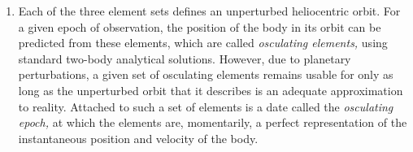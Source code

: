 \documentclass[11pt,fleqn,twoside]{article}
\renewcommand{\_}{{\tt\char'137}}     %
\begin{document}
{\begin{enumerate}
        ${\tt jform}=3$, suitable for comets:
 
        \begin{tabbing}
        xxx \= xxxxxxx \= xx \= \kill
        \> {\tt epoch}  \> = \> epoch of perihelion $T$ (TDB MJD) \\
        \> {\tt orbinc} \> = \> inclination $i$ (radians) \\
        \> {\tt anode}  \> = \> longitude of the ascending node $\Omega$ (radians) \\
        \> {\tt perih}  \> = \> argument of perihelion $\omega$ (radians) \\
        \> {\tt aorq}   \> = \> perihelion distance $q$ (AU) \\
        \> {\tt e}      \> = \> eccentricity $e$
        \end{tabbing}
        Unused elements ({\tt dm} for ${\tt jform}=2$,
        {\tt aorl} and {\tt dm} for ${\tt jform}=3$) are
        not accessed.
 
  \item Each of the three element sets defines an unperturbed heliocentric
        orbit.  For a given epoch of observation, the position of the body
        in its orbit can be predicted from these elements, which are
        called {\it osculating elements,}\/
        using standard two-body analytical
        solutions.  However, due to planetary perturbations, a given set
        of osculating elements remains usable for only as long as the
        unperturbed orbit that it describes is an adequate approximation
        to reality.  Attached to such a set of elements is a date called
        the {\it osculating epoch,}\/
        at which the elements are, momentarily,
        a perfect representation of the instantaneous position and
        velocity of the body.
 
        \vspace{1ex}
 

\end{enumerate}}
\end{document}
